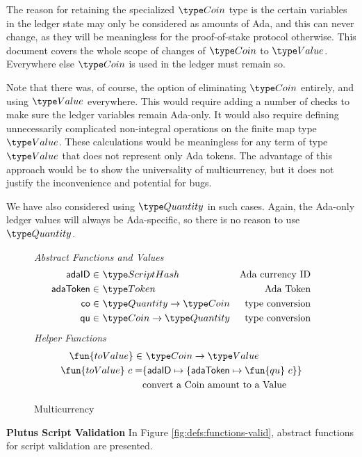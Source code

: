 The reason for retaining the specialized $\Coin$ type is the certain variables
in the ledger state may only be considered as amounts of Ada, and this can
never change, as they will be meaningless for the proof-of-stake protocol
otherwise. This document
covers the whole scope of changes of $\Coin$ to $\Value$. Everywhere else $\Coin$
is used in the ledger must remain so.

Note that there was, of course, the option of eliminating $\Coin$ entirely,
and using $\Value$ everywhere. This would require adding a number of checks
to make sure the ledger variables remain Ada-only. It would also require
defining unnecessarily complicated non-integral operations on the finite map
type $\Value$. These calculations would be meaningless for any term of type
$\Value$ that does not represent only Ada tokens. The advantage of this approach
would be to show the universality of multicurrency, but it does not
justify the inconvenience and potential for bugs.

We have also considered using $\Quantity$ in such cases. Again, the Ada-only
ledger values will always be Ada-specific, so there is no reason to use $\Quantity$.


\begin{figure*}[htb]
  \emph{Abstract Functions and Values}
  \begin{align*}
    \mathsf{adaID} \in& ~\ScriptHash
    & \text{Ada currency ID} \\
    \mathsf{adaToken} \in& ~\Token
    & \text{Ada Token} \\
    \mathsf{co} \in& ~\Quantity \to \Coin
    & \text{type conversion} \\
    \mathsf{qu} \in& ~\Coin \to \Quantity
    & \text{type conversion} \\
  \end{align*}
  \emph{Helper Functions}
  \begin{align*}
    \fun{toValue} \in & ~\Coin\to \Value \\
    \fun{toValue}~ c = & \{\mathsf{adaID} \mapsto \{\mathsf{adaToken} \mapsto \fun{qu}~c\}\} \\
    &\text{convert a Coin amount to a Value} \\
  \end{align*}
  \caption{Multicurrency}
  \label{fig:defs:functions-helper}
\end{figure*}

\textbf{Plutus Script Validation}
In Figure \ref{fig:defs:functions-valid}, abstract functions for script validation
are presented.

